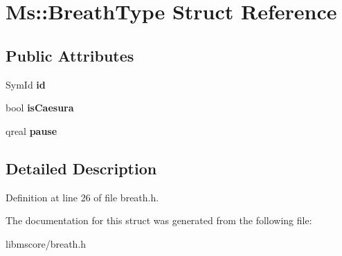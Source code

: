 \hypertarget{struct_ms_1_1_breath_type}{}\section{Ms\+:\+:Breath\+Type Struct Reference}
\label{struct_ms_1_1_breath_type}
\subsection*{Public Attributes}
\begin{DoxyCompactItemize}
\item 
\mbox{\label{struct_ms_1_1_breath_type_af1bc2740be9c073797c36fc1137a4e87}} 
Sym\+Id {\bfseries id}
\item 
\mbox{\label{struct_ms_1_1_breath_type_acaf4a24e830e6f9273e59fefc72a26b6}} 
bool {\bfseries is\+Caesura}
\item 
\mbox{\label{struct_ms_1_1_breath_type_ac45a8298b526746809ff0decf2994ce4}} 
qreal {\bfseries pause}
\end{DoxyCompactItemize}


\subsection{Detailed Description}


Definition at line 26 of file breath.\+h.



The documentation for this struct was generated from the following file\+:\begin{DoxyCompactItemize}
\item 
libmscore/breath.\+h\end{DoxyCompactItemize}

